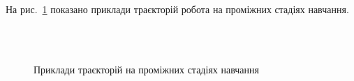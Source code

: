 \documentclass[a4paper,10pt,fleqn]{article}
\begin{document}
На рис.~\ref{fig:samples-samples} показано приклади траєкторій робота на проміжних стадіях навчання.

\begin{figure}
  \centering
  \,
   \\
  \,
  \caption{Приклади траєкторій на проміжних стадіях навчання}
  \label{fig:samples-samples}
\end{figure}
\end{document}
